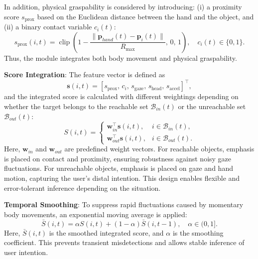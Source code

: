 \documentclass[../../main.tex]{subfiles} %
\begin{document}
In addition, physical graspability is considered by introducing:  
(i) a proximity score $s_{\text{prox}}$ based on the Euclidean distance between the hand and the object, and  
(ii) a binary contact variable $c_i(t)$:
\begin{equation}
s_{\text{prox}}(i,t) = \operatorname{clip}\left(1 - \frac{\|\mathbf{p}_{hand}(t)-\mathbf{p}_i(t)\|}{R_{\max}},\,0,\,1\right), \quad
c_i(t) \in \{0,1\}.
\end{equation}
Thus, the module integrates both body movement and physical graspability.

\medskip
\textbf{Score Integration}:  
The feature vector is defined as
\begin{equation}
\mathbf{s}(i,t) = [s_{\text{prox}},\,c_i,\,s_{\text{gaze}},\,s_{\text{head}},\,s_{\text{accel}}]^\top,
\end{equation}
and the integrated score is calculated with different weightings depending on whether 
the target belongs to the reachable set $\mathcal{B}_{in}(t)$  
or the unreachable set $\mathcal{B}_{out}(t)$:
\begin{equation}
S(i,t) =
\begin{cases}
\mathbf{w}_{in}^\top \mathbf{s}(i,t), & i \in \mathcal{B}_{in}(t), \\[6pt]
\mathbf{w}_{out}^\top \mathbf{s}(i,t), & i \in \mathcal{B}_{out}(t).
\end{cases}
\end{equation}
Here, $\mathbf{w}_{in}$ and $\mathbf{w}_{out}$ are predefined weight vectors.  
For reachable objects, emphasis is placed on contact and proximity, 
ensuring robustness against noisy gaze fluctuations.  
For unreachable objects, emphasis is placed on gaze and hand motion, capturing the user’s distal intention.  
This design enables flexible and error-tolerant inference depending on the situation.

\medskip
\textbf{Temporal Smoothing}:  
To suppress rapid fluctuations caused by momentary body movements,  
an exponential moving average is applied:
\begin{equation}
\bar{S}(i,t) = \alpha S(i,t) + (1-\alpha)\bar{S}(i,t-1), \quad \alpha \in (0,1].
\end{equation}
Here, $\bar{S}(i,t)$ is the smoothed integrated score, and $\alpha$ is the smoothing coefficient.  
This prevents transient misdetections and allows stable inference of user intention.
\end{document}
